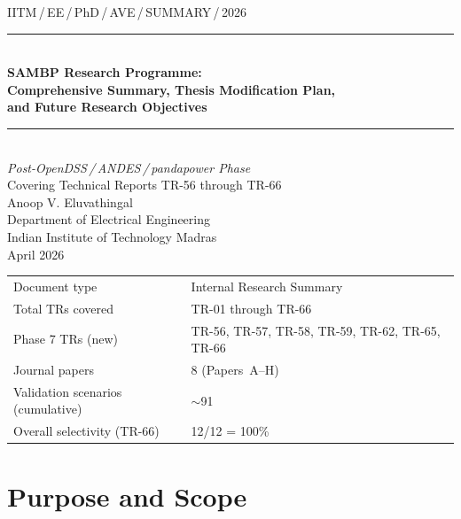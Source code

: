 \documentclass[12pt,a4paper]{article}
\begin{document}

\begin{titlepage}
  \vspace*{20mm}
  \begin{center}
    {\small IITM\,/\,EE\,/\,PhD\,/\,AVE\,/\,SUMMARY\,/\,2026}\\[8mm]
    \rule{\linewidth}{1.2pt}\\[4mm]
    {\LARGE\bfseries\color{sectionblue}
      SAMBP Research Programme:\\[4pt]
      Comprehensive Summary, Thesis Modification Plan,\\[4pt]
      and Future Research Objectives}\\[4mm]
    \rule{\linewidth}{1.2pt}\\[10mm]
    {\large\itshape Post-OpenDSS\,/\,ANDES\,/\,pandapower Phase}\\[2mm]
    {\large Covering Technical Reports TR-56 through TR-66}\\[12mm]
    {\large Anoop V. Eluvathingal}\\[3mm]
    {\normalsize Department of Electrical Engineering\\
     Indian Institute of Technology Madras}\\[8mm]
    {\normalsize April 2026}\\[20mm]
    \begin{tabular}{ll}
      \toprule
      Document type & Internal Research Summary \\
      Total TRs covered & TR-01 through TR-66 \\
      Phase 7 TRs (new) & TR-56, TR-57, TR-58, TR-59, TR-62, TR-65, TR-66 \\
      Journal papers & 8 (Papers~A--H) \\
      Validation scenarios (cumulative) & $\sim$91 \\
      Overall selectivity (TR-66) & 12/12 = 100\% \\
      \bottomrule
    \end{tabular}
  \end{center}
\end{titlepage}

\tableofcontents
\clearpage

\section{Purpose and Scope}
\label{sec:purpose}
\end{document}
